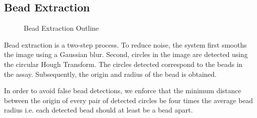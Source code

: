 \documentclass{sig-alternate}
\begin{document}
	\subsection{Bead Extraction} %
	\label{sub:Bead Extraction}
		\begin{figure}[htp!]
			\centering
			\caption{Bead Extraction Outline}
			\label{fig:beadex}
		\end{figure}
		Bead extraction is a two-step process. To reduce noise, the system
		first smooths the image using a Gaussian blur. Second, circles in
		the image are detected using the circular Hough Transform. The
		circles detected correspond to the beads in the assay.
		Subsequently, the origin and radius of the bead is obtained.

		In order to avoid false bead detections, we enforce that the minimum
		distance between the origin of every pair of detected circles be four
		times the average bead radius i.e. each detected bead should at least
		be a bead apart.
\end{document}
